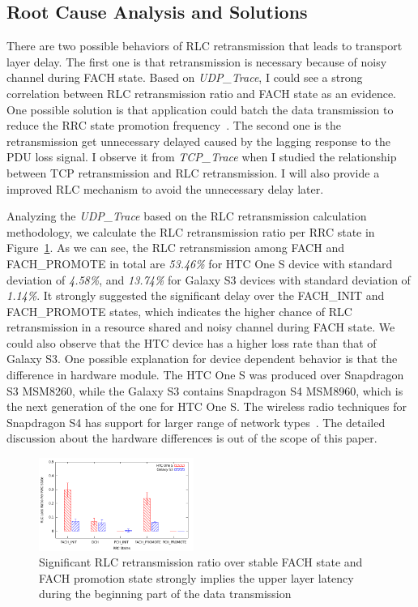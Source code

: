 \subsection{Root Cause Analysis and Solutions}

There are two possible behaviors of RLC retransmission that leads to transport layer delay. The first one is that retransmission is necessary because of noisy channel during FACH state. Based on \emph{UDP\_{}Trace}, I could see a strong correlation between RLC retransmission ratio and FACH state as an evidence. One possible solution is that application could batch the data transmission to reduce the RRC state promotion frequency~\cite{3g_rrc}. The second one is the retransmission get unnecessary delayed caused by the lagging response to the PDU loss signal. I observe it from \emph{TCP\_{}Trace} when I studied the relationship between TCP retransmission and RLC retransmission. I will also provide a improved RLC mechanism to avoid the unnecessary delay later.

Analyzing the \emph{UDP\_{}Trace} based on the RLC retransmission calculation methodology, we calculate the RLC retransmission ratio per RRC state in Figure~\ref{fig:RLC.Loss.Per.RRC.UDPTrace}. As we can see, the RLC retransmission among FACH and FACH\_{}PROMOTE in total are \textit{53.46\%} for HTC One S device with standard deviation of \textit{4.58\%}, and \textit{13.74\%} for Galaxy S3 devices with standard deviation of \textit{1.14\%}. It strongly suggested the significant delay over the FACH\_{}INIT and FACH\_{}PROMOTE states, which indicates the higher chance of RLC retransmission in a resource shared and noisy channel during FACH state. We could also observe that the HTC device has a higher loss rate than that of Galaxy S3. One possible explanation for device dependent behavior is that the difference in hardware module. The HTC One S was produced over Snapdragon S3 MSM8260, while the Galaxy S3 contains Snapdragon S4 MSM8960, which is the next generation of the one for HTC One S. The wireless radio techniques for Snapdragon S4 has support for larger range of network types~\cite{snapdragon}. The detailed discussion about the hardware differences is out of the scope of this paper.

\begin{figure}
\centering
\includegraphics[width=0.45\textwidth]{figs/rlc_retx_udp.png}
\caption{Significant RLC retransmission ratio over stable FACH state and FACH promotion state strongly implies the upper layer latency during the beginning part of the data transmission}
\label{fig:RLC.Loss.Per.RRC.UDPTrace}
\end{figure}

